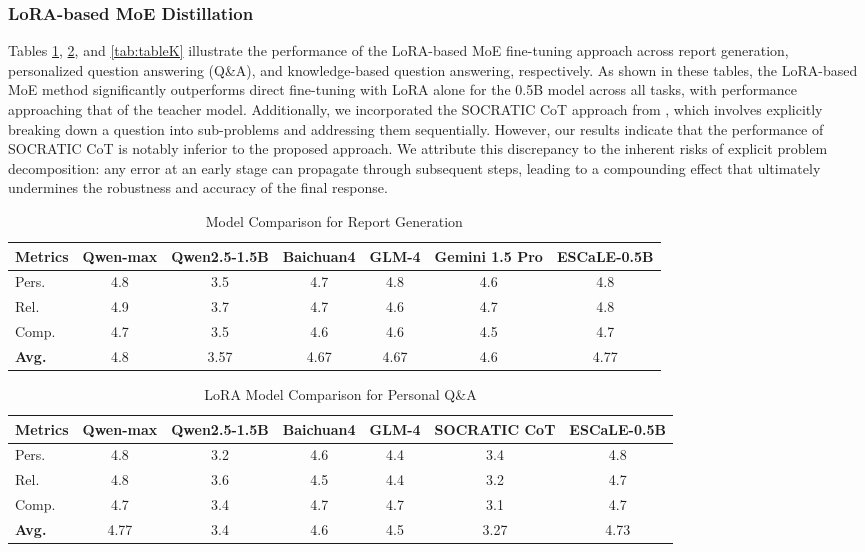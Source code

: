 \documentclass[preprint,12pt]{elsarticle}
\begin{document}
\subsubsection{LoRA-based MoE Distillation}
Tables \ref{tab:tableM}, \ref{tab:tableP}, and \ref{tab:tableK} illustrate the performance of the LoRA-based MoE fine-tuning approach across report generation, personalized question answering (Q\&A), and knowledge-based question answering, respectively. As shown in these tables, the LoRA-based MoE method significantly outperforms direct fine-tuning with LoRA alone for the 0.5B model across all tasks, with performance approaching that of the teacher model. Additionally, we incorporated the SOCRATIC CoT approach from \cite{shridhar2022distilling}, which involves explicitly breaking down a question into sub-problems and addressing them sequentially. However, our results indicate that the performance of SOCRATIC CoT is notably inferior to the proposed approach. We attribute this discrepancy to the inherent risks of explicit problem decomposition: any error at an early stage can propagate through subsequent steps, leading to a compounding effect that ultimately undermines the robustness and accuracy of the final response. 

\begin{table}[!t]
\centering
\caption{\label{tab:tableM} Model Comparison for Report Generation}
\setlength{\tabcolsep}{2.5pt} %
\renewcommand{\arraystretch}{0.8} %
\footnotesize
\begin{tabular}{l*{6}{c}}
\toprule
Metrics & Qwen-max & Qwen2.5-1.5B & Baichuan4 & GLM-4 & Gemini 1.5 Pro & ESCaLE-0.5B \\
\midrule
Pers. & 4.8 & 3.5 & 4.7 & 4.8 & 4.6 & 4.8 \\
Rel. & 4.9 & 3.7 & 4.7 & 4.6 & 4.7 & 4.8 \\
Comp. & 4.7 & 3.5 & 4.6 & 4.6 & 4.5 & 4.7 \\
\textbf{Avg.} & 4.8 & 3.57 & 4.67 & 4.67 & 4.6 & 4.77 \\
\bottomrule
\end{tabular}
\end{table}

\begin{table}[!t]
\centering
\caption{\label{tab:tableP} LoRA Model Comparison for Personal Q\&A}
\setlength{\tabcolsep}{2.5pt} %
\renewcommand{\arraystretch}{0.8} %
\footnotesize
\begin{tabular}{l*{6}{c}}
\toprule
Metrics & Qwen-max & Qwen2.5-1.5B & Baichuan4 & GLM-4  & SOCRATIC CoT & ESCaLE-0.5B \\
\midrule
Pers. & 4.8 & 3.2 & 4.6 & 4.4  & 3.4 & 4.8 \\
Rel. & 4.8 & 3.6 & 4.5 & 4.4  & 3.2 & 4.7 \\
Comp. & 4.7 & 3.4 & 4.7 & 4.7  & 3.1 & 4.7 \\
\textbf{Avg.} & 4.77 & 3.4 & 4.6 & 4.5 & 3.27 & 4.73 \\
\bottomrule
\end{tabular}
\end{table}
\end{document}
